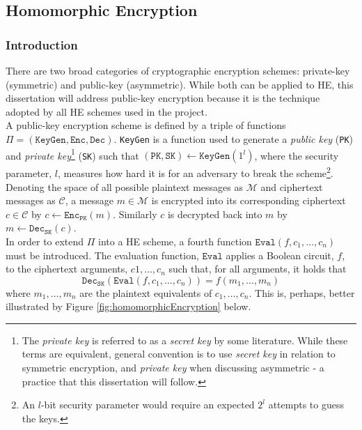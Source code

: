 \setlength{\leftskip}{0cm}

\subsection{Homomorphic Encryption}
\label{sec:homomorphicEncryption}
\subsubsection{Introduction}
\setlength{\leftskip}{0.5cm}
\indent \indent
There are two broad categories of cryptographic encryption schemes: private-key (symmetric) and public-key (asymmetric). While both can be applied to HE, this dissertation will address public-key encryption because it is the technique adopted by all HE schemes used in the project.
\smallskip \\ \indent
A public-key encryption scheme is defined by a triple of functions $\Pi = (\texttt{KeyGen}, \texttt{Enc}, \texttt{Dec})$. \texttt{KeyGen} is a function used to generate a \textit{public key} (\texttt{PK}) and \textit{private key}\footnote{The \textit{private key} is referred to as a \textit{secret key} by some literature. While these terms are equivalent, general convention is to use \textit{secret key} in relation to symmetric encryption, and \textit{private key} when discussing asymmetric - a practice that this dissertation will follow.} (\texttt{SK}) such that $(\texttt{PK}, \texttt{SK}) \leftarrow \texttt{KeyGen}(1^l)$, where the security parameter, $l$, measures how hard it is for an adversary to break the scheme\footnote{An $l$-bit security parameter would require an expected $2^l$ attempts to guess the keys.}. Denoting the space of all possible plaintext messages as $\mathcal{M}$ and ciphertext messages as $\mathcal{C}$, a message $m \in \mathcal{M}$ is encrypted into its corresponding ciphertext $c \in \mathcal{C}$ by $c \leftarrow \texttt{Enc}_\texttt{PK}(m)$. Similarly $c$ is decrypted back into $m$ by $m \leftarrow \texttt{Dec}_\texttt{SK}(c)$.
\smallskip \\ \indent
In order to extend $\Pi$ into a HE scheme, a fourth function $\texttt{Eval}(f, c_1, \ldots, c_n)$ must be introduced. The evaluation function, $\texttt{Eval}$ applies a Boolean circuit, $f$, to the ciphertext arguments, $c1, \ldots, c_n$ such that, for all arguments, it holds that
\begin{equation}
    \texttt{Dec}_\texttt{SK}(\texttt{Eval}(f, c_1, \ldots, c_n)) = f(m_1, \ldots, m_n)
\end{equation}
where $m_1, \ldots, m_n$ are the plaintext equivalents of $c_1, \ldots, c_n$. This is, perhaps, better illustrated by Figure \ref{fig:homomorphicEncryption} below.

